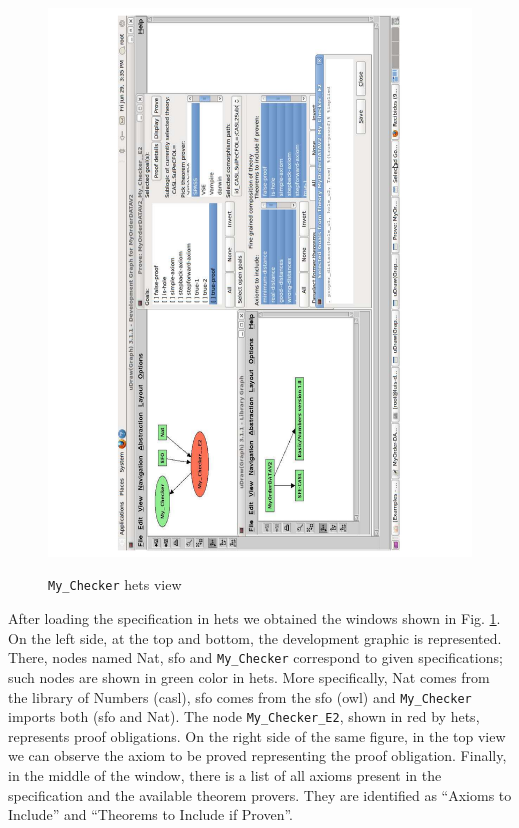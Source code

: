 \begin{figure}
\begin{center}
	\includegraphics[scale=0.5, angle=270]{figure-chapterIV/fig4-39}\\
	\caption{\texttt{My\_Checker} \gls{hets} view }
	\label{figure4-39}
\end{center}
\end{figure}


After loading the specification in \gls{hets} we obtained the windows shown in Fig. \ref{figure4-39}.  On the left side, at the top and bottom, the development graphic is represented. There, nodes named Nat, \gls{sfo} and \texttt{My\_Checker} correspond to given specifications; such nodes are shown in green color in \gls{hets}. More specifically, Nat comes from the library of Numbers (\gls{casl}), \gls{sfo} comes from the \gls{sfo} (\gls{owl}) and \texttt{My\_Checker} imports both (\gls{sfo} and Nat). The node \texttt{My\_Checker\_E2}, shown in red by \gls{hets}, represents proof obligations. On the right side of the same figure, in the top  view we can observe the axiom to be proved representing the proof obligation. Finally, in the  middle of the  window, there is a list of all axioms present in the specification and the available theorem provers. They are identified as “Axioms to Include” and “Theorems to Include if Proven”.  

